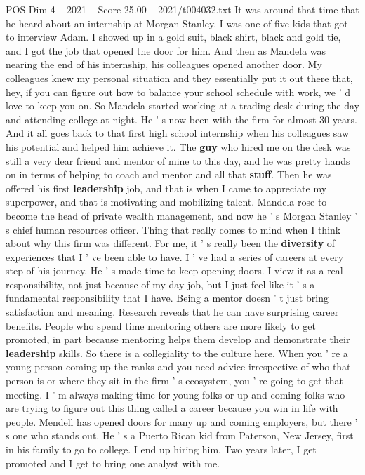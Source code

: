 \begin{textsample}{POS Dim 4 – 2021 – Score 25.00 – 2021/t004032.txt}
It was around that time that he heard about an internship at Morgan Stanley.
I was one of five kids that got to interview Adam.
I showed up in a gold suit, black shirt, black and gold tie, and I got the job that opened the door for him.
And then as Mandela was nearing the end of his internship, his colleagues opened another door.
My colleagues knew my personal situation and they essentially put it out there that, hey, if you can figure out how to balance your school schedule with work, we ' d love to keep you on.
So Mandela started working at a trading desk during the day and attending college at night.
He ' s now been with the firm for almost 30 years.
And it all goes back to that first high school internship when his colleagues saw his potential and helped him achieve it.
The \textbf{guy} who hired me on the desk was still a very dear friend and mentor of mine to this day, and he was pretty hands on in terms of helping to coach and mentor and all that \textbf{stuff}.
Then he was offered his first \textbf{leadership} job, and that is when I came to appreciate my superpower, and that is motivating and mobilizing talent.
Mandela rose to become the head of private wealth management, and now he ' s Morgan Stanley ' s chief human resources officer.
Thing that really comes to mind when I think about why this firm was different.
For me, it ' s really been the \textbf{diversity} of experiences that I ' ve been able to have.
I ' ve had a series of careers at every step of his journey.
He ' s made time to keep opening doors.
I view it as a real responsibility, not just because of my day job, but I just feel like it ' s a fundamental responsibility that I have.
Being a mentor doesn ' t just bring satisfaction and meaning.
Research reveals that he can have surprising career benefits.
People who spend time mentoring others are more likely to get promoted, in part because mentoring helps them develop and demonstrate their \textbf{leadership} skills.
So there is a collegiality to the culture here.
When you ' re a young person coming up the ranks and you need advice irrespective of who that person is or where they sit in the firm ' s ecosystem, you ' re going to get that meeting.
I ' m always making time for young folks or up and coming folks who are trying to figure out this thing called a career because you win in life with people.
Mendell has opened doors for many up and coming employers, but there ' s one who stands out.
He ' s a Puerto Rican kid from Paterson, New Jersey, first in his family to go to college.
I end up hiring him.
Two years later, I get promoted and I get to bring one analyst with me.

\end{textsample}

